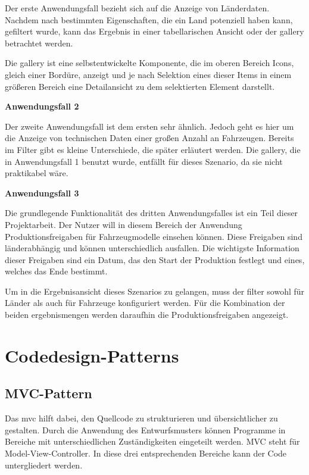 Der erste Anwendungsfall bezieht sich auf die Anzeige von Länderdaten. Nachdem nach bestimmten Eigenschaften, die ein Land potenziell haben kann, gefiltert wurde, kann das Ergebnis in einer tabellarischen Ansicht oder der \gls{gallery} betrachtet werden.

Die \gls{gallery} ist eine selbstentwickelte Komponente, die im oberen Bereich Icons, gleich einer Bordüre, anzeigt und je nach Selektion eines dieser Items in einem größeren Bereich eine Detailansicht zu dem selektierten Element darstellt.

\textbf{Anwendungsfall 2}

Der zweite Anwendungsfall ist dem ersten sehr ähnlich. Jedoch geht es hier um die Anzeige von technischen Daten einer großen Anzahl an Fahrzeugen. Bereits im Filter gibt es kleine Unterschiede, die später erläutert werden. Die \gls{gallery}, die in Anwendungsfall 1 benutzt wurde, entfällt für dieses Szenario, da sie nicht praktikabel wäre.

\textbf{Anwendungsfall 3}

Die grundlegende Funktionalität des dritten Anwendungsfalles ist ein Teil dieser Projektarbeit. Der Nutzer will in diesem Bereich der Anwendung Produktionsfreigaben für Fahrzeugmodelle einsehen können. Diese Freigaben sind länderabhängig und können unterschiedlich ausfallen. Die wichtigste Information dieser Freigaben sind ein Datum, das den Start der Produktion festlegt und eines, welches das Ende bestimmt.

Um in die Ergebnisansicht dieses Szenarios zu gelangen, muss der \gls{filter} sowohl für Länder als auch für Fahrzeuge konfiguriert werden. Für die Kombination der beiden \gls{ergebnismenge}n werden daraufhin die Produktionsfreigaben angezeigt.
\section{Codedesign-Patterns} \label{sec:grundPattern}
\subsection{MVC-Pattern} \label{sec:patternMVC}
Das \gls{mvc} hilft dabei, den Quellcode zu strukturieren und übersichtlicher zu gestalten. Durch die Anwendung des Entwurfsmusters können Programme in Bereiche mit unterschiedlichen Zuständigkeiten eingeteilt werden. MVC steht für Model-View-Controller. In diese drei entsprechenden Bereiche kann der Code untergliedert werden. \cite[S. 529ff.]{Freeman2006}

